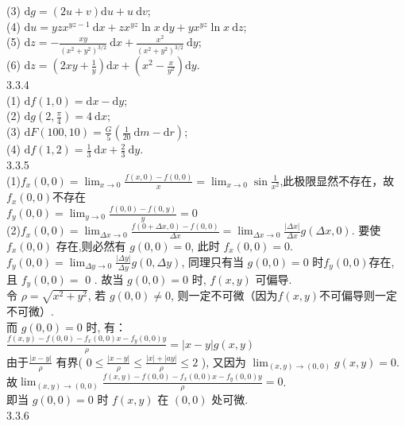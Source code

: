 \documentclass[a4paper,11pt,UTF8]{article}
\begin{document}
(3) $\mathrm{d} g=(2 u+v) \mathrm{d} u+u \mathrm{~d} v$;\\
(4) $\mathrm{d} u=y z x^{yz-1} \mathrm{~d} x+z x^{y z} \ln x \mathrm{~d} y+y x^{y z} \ln x \mathrm{~d} z$;\\
(5) $\mathrm{d} z=-\frac{x y}{\left(x^2+y^2\right)^{3 / 2}} \mathrm{~d} x+\frac{x^2}{\left(x^2+y^2\right)^{3 / 2}} \mathrm{~d} y$;\\
(6) $\mathrm{d} z=\left(2 x y+\frac{1}{y}\right) \mathrm{d} x+\left(x^2-\frac{x}{y^2}\right) \mathrm{d} y$.\\
3.3.4\\
(1) $\mathrm{d} f(1,0)=\mathrm{d} x-\mathrm{d} y$;\\
(2) $\mathrm{d}g\left(2, \frac{\pi}{4}\right)=4 \mathrm{~d} x$;\\
(3) $\mathrm{d} F(100,10)=\frac{G}{5}\left(\frac{1}{20} \mathrm{~d} m-\mathrm{d} r\right)$;\\
(4) $\mathrm{d} f(1,2)=\frac{1}{3} \mathrm{~d} x+\frac{2}{3} \mathrm{~d} y$.\\
3.3.5\\
(1)$f_x(0,0)=\lim_{x\to 0}\frac{f(x,0)-f(0,0)}{x}=\lim_{x\to 0}\sin {\frac{1}{x^2}}$,此极限显然不存在，故$f_x(0,0)$不存在\\
$f_y(0,0)=\lim_{y\to 0}\frac{f(0,0)-f(0,y)}{y}=0$\\
(2)$f_x(0,0)=\lim _{\Delta x \rightarrow 0} \frac{f(0+\Delta x, 0)-f(0,0)}{\Delta x}=\lim _{\Delta x \rightarrow 0} \frac{|\Delta x|}{\Delta x} g(\Delta x, 0)$. 要使 $f_x(0,0)$ 存在,则必然有 $g(0,0)=0$, 此时 $f_x(0,0)=0$.\\
$f_y(0,0)=\lim _{\Delta y \rightarrow 0} \frac{|\Delta y|}{\Delta y} g(0, \Delta y)$, 同理只有当 $g(0,0)=0$ 时$f_y(0,0)$存在, 且 $f_y(0,0)=$ 0 . 故当 $g(0,0)=0$ 时, $f(x, y)$ 可偏导.\\
令 $\rho=\sqrt{x^2+y^2}$, 若 $g(0,0) \neq 0$, 则一定不可微（因为$f(x,y)$不可偏导则一定不可微）.\\
而 $g(0,0)=0$ 时, 有：\\
$\frac{f(x,y)-f(0,0)-f_x(0,0)x-f_y(0,0)y }{\rho}
= |x- y| g(x, y)$\\
由于$ \frac{| x- y|}{\rho}$ 有界( $0\leqslant\frac{| x- y|}{\rho} \leqslant \frac{| x|+|a y|}{\rho} \leqslant 2$ ), 又因为 $\lim _{(x,y) \rightarrow (0,0)} g(x,y)=0$.\\
故$\lim_{(x,y)\to (0,0)}\frac{f(x,y)-f(0,0)-f_x(0,0)x-f_y(0,0)y }{\rho}=0$. \\
即当 $g(0,0)=0$ 时 $f(x, y)$ 在 $(0,0)$ 处可微.\\
3.3.6\\
\end{document}
